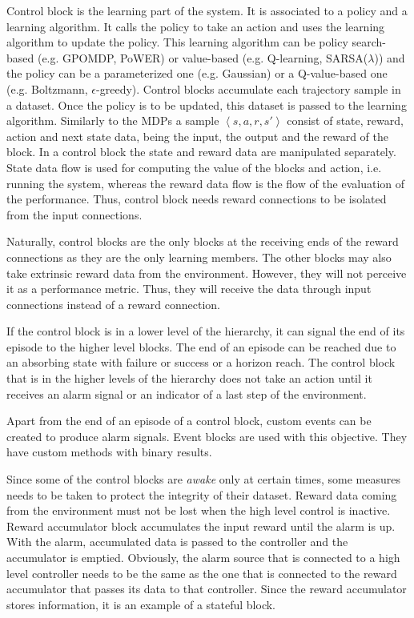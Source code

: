 Control block is the learning part of the system. It is associated to a policy and a learning algorithm. It calls the policy to take an action and uses the learning algorithm to update the policy. This learning algorithm can be policy search-based (e.g. GPOMDP, PoWER) or value-based (e.g. Q-learning, SARSA($\lambda$)) and the policy can be a parameterized one (e.g. Gaussian) or a Q-value-based one (e.g. Boltzmann, $\epsilon$-greedy). Control blocks accumulate each trajectory sample in a dataset. Once the policy is to be updated, this dataset is passed to the learning algorithm. Similarly to the MDPs a sample $\left\langle s,a,r,s'\right\rangle$ consist of state, reward, action and next state data, being the input, the output and the reward of the block.
In a control block the state and reward data are manipulated separately. State data flow is used for computing the value of the blocks and action, i.e. running the system, whereas the reward data flow is the flow of the evaluation of the performance. Thus, control block needs reward connections to be isolated from the input connections.

Naturally, control blocks are the only blocks at the receiving ends of the reward connections as they are the only learning members. The other blocks may also take extrinsic reward data from the environment. However, they will not perceive it as a performance metric. Thus, they will receive the data through input connections instead of a reward connection.

If the control block is in a lower level of the hierarchy, it can signal the end of its episode to the higher level blocks. The end of an episode can be reached due to an absorbing state with failure or success or a horizon reach. The control block that is in the higher levels of the hierarchy does not take an action until it receives an alarm signal or an indicator of a last step of the environment.  

Apart from the end of an episode of a control block, custom events can be created to produce alarm signals. Event blocks are used with this objective. 
They have custom methods with binary results.

Since some of the control blocks are \textit{awake} only at certain times, some measures needs to be taken to protect the integrity of their dataset. Reward data coming from the environment must not be lost when the high level control is inactive. Reward accumulator block accumulates the input reward until the alarm is up. With the alarm, accumulated data is passed to the controller and the accumulator is emptied. Obviously, the alarm source that is connected to a high level controller needs to be the same as the one that is connected to the reward accumulator that passes its data to that controller. Since the reward accumulator stores information, it is an example of a stateful block.

